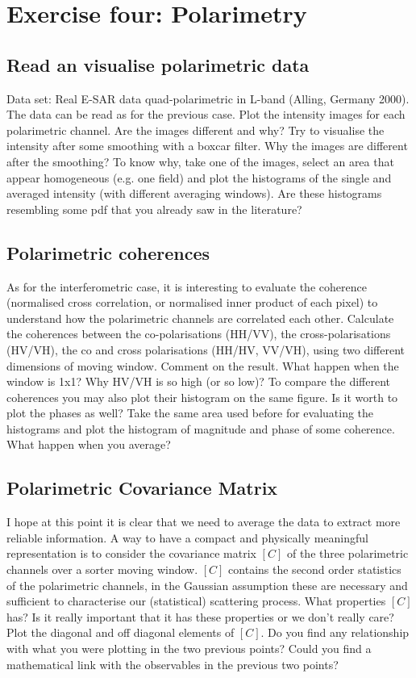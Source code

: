 \newpage
\section{Exercise four: Polarimetry}

\subsection{Read an visualise polarimetric data}
Data set: Real E-SAR data quad-polarimetric in L-band (Alling, Germany 2000). The data can be read as for the previous case. Plot the intensity images for each polarimetric channel. Are the images different and why? Try to visualise the intensity after some smoothing with a boxcar filter. Why the images are different after the smoothing? To know why, take one of the images, select an area that appear homogeneous (e.g. one field) and plot the histograms of the single and averaged intensity (with different averaging windows). Are these histograms resembling some pdf that you already saw in the literature?

\subsection{Polarimetric coherences}
As for the interferometric case, it is interesting to evaluate the coherence (normalised cross correlation, or normalised inner product of each pixel) to understand how the polarimetric channels are correlated each other. Calculate the coherences between the co-polarisations (HH/VV), the cross-polarisations (HV/VH), the co and cross polarisations (HH/HV, VV/VH), using two different dimensions of moving window. Comment on the result. What happen when the window is 1x1? Why HV/VH is so high (or so low)? To compare the different coherences you may also plot their histogram on the same figure.
Is it worth to plot the phases as well? Take the same area used before for evaluating the histograms and plot the histogram of magnitude and phase of some coherence. What happen when you average?

\subsection{Polarimetric Covariance Matrix}
I hope at this point it is clear that we need to average the data to extract more reliable information. A way to have a compact and physically meaningful representation is to consider the covariance matrix $[C]$ of the three polarimetric channels over a sorter moving window. $[C]$ contains the second order statistics of the polarimetric channels, in the Gaussian assumption these are necessary and sufficient to characterise our (statistical) scattering process. What properties $[C]$ has? Is it really important that it has these properties or we don't really care? Plot the diagonal and off diagonal elements of $[C]$. Do you find any relationship with what you were plotting in the two previous points? Could you find a mathematical link with the observables in the previous two points?

